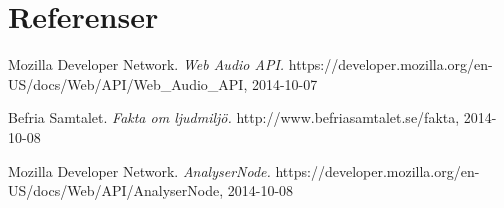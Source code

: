 \documentclass[12pt, titlepage, a4paper]{article}
\begin{document}
	\pagebreak
	
	\section{Referenser}
	\renewcommand{\addcontentsline}[3]{}%
  \renewcommand{\section}[2]{}%
  \begin{thebibliography}{1}

    Mozilla Developer Network.
    \emph{Web Audio API.}
    https://developer.mozilla.org/en-US/docs/Web/API/Web\_Audio\_API, 2014-10-07

    Befria Samtalet.
    \emph{Fakta om ljudmiljö.}
    http://www.befriasamtalet.se/fakta, 2014-10-08

    Mozilla Developer Network.
    \emph{AnalyserNode.}
    https://developer.mozilla.org/en-US/docs/Web/API/AnalyserNode, 2014-10-08
  \end{thebibliography}
\end{document}
